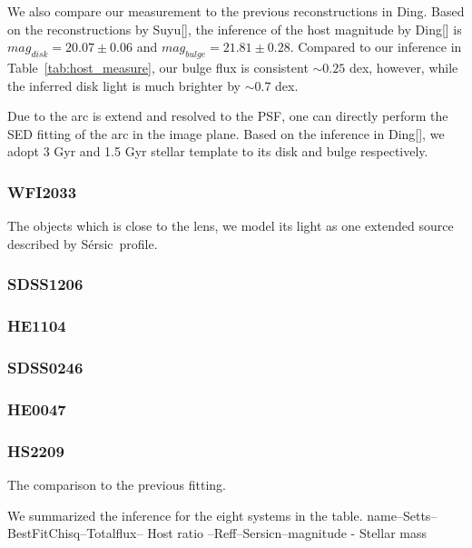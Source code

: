 \documentclass[fleqn,usenatbib]{mnras}
\newcommand{\sersic}{S\'ersic}
\begin{document}
We also compare our measurement to the previous reconstructions in Ding. Based on the reconstructions by Suyu[], the inference of the host magnitude by Ding[] is $mag_{disk} = 20.07\pm0.06$ and $mag_{bulge} = 21.81 \pm 0.28$. Compared to our inference in Table~\ref{tab:host_measure}, our bulge flux is consistent $\sim0.25$ dex, however, while the inferred disk light is much brighter by $\sim 0.7$ dex.

Due to the arc is extend and resolved to the PSF, one can directly perform the SED fitting of the arc in the image plane. Based on the inference in Ding[], we adopt 3 Gyr and 1.5 Gyr stellar template to its disk and bulge respectively.

\subsubsection{WFI2033}
The objects which is close to the lens, we model its light as one extended source described by \sersic\ profile. 

\subsubsection{SDSS1206}

\subsubsection{HE1104}

\subsubsection{SDSS0246}

\subsubsection{HE0047}

\subsubsection{HS2209}

The comparison to the previous fitting.

We summarized the inference for the eight systems in the table.
name--Setts--BestFitChisq--Totalflux-- Host ratio --Reff--Sersicn--magnitude - Stellar mass
\end{document}
